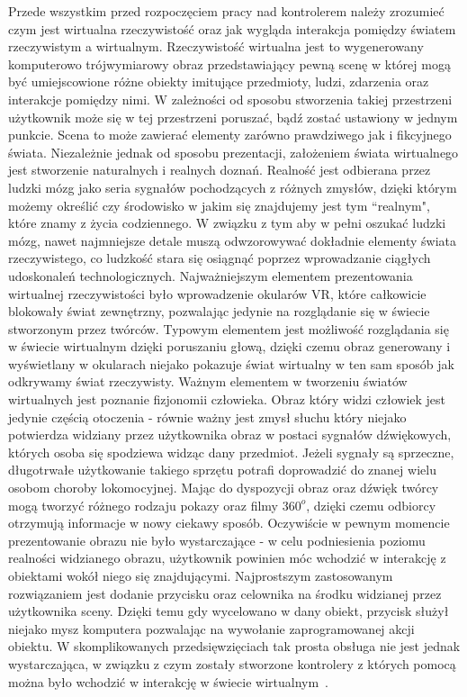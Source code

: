 	Przede wszystkim przed rozpoczęciem pracy nad kontrolerem należy zrozumieć czym jest wirtualna rzeczywistość oraz jak wygląda interakcja pomiędzy światem rzeczywistym a wirtualnym. Rzeczywistość wirtualna jest to wygenerowany komputerowo trójwymiarowy obraz przedstawiający pewną scenę w której mogą być umiejscowione różne obiekty imitujące przedmioty, ludzi, zdarzenia oraz interakcje pomiędzy nimi. W zależności od sposobu stworzenia takiej przestrzeni użytkownik może się w tej przestrzeni poruszać, bądź zostać ustawiony w jednym punkcie. Scena to może zawierać elementy zarówno prawdziwego jak i fikcyjnego świata. Niezależnie jednak od sposobu prezentacji, założeniem świata wirtualnego jest stworzenie naturalnych i realnych doznań. Realność jest odbierana przez ludzki mózg jako seria sygnałów pochodzących z różnych zmysłów, dzięki którym możemy określić czy środowisko w jakim się znajdujemy jest tym ``realnym", które znamy z życia codziennego. W związku z tym aby w pełni oszukać ludzki mózg, nawet najmniejsze detale muszą odwzorowywać dokładnie elementy świata rzeczywistego, co ludzkość stara się osiągnąć poprzez wprowadzanie ciągłych udoskonaleń technologicznych. Najważniejszym elementem prezentowania wirtualnej rzeczywistości było wprowadzenie okularów VR, które całkowicie blokowały świat zewnętrzny, pozwalając jedynie na rozglądanie się w świecie stworzonym przez twórców. Typowym elementem jest możliwość rozglądania się w świecie wirtualnym dzięki poruszaniu głową, dzięki czemu obraz generowany i wyświetlany w okularach niejako pokazuje świat wirtualny w ten sam sposób jak odkrywamy świat rzeczywisty. Ważnym elementem w tworzeniu światów wirtualnych jest poznanie fizjonomii człowieka. Obraz który widzi człowiek jest jedynie częścią otoczenia - równie ważny jest zmysł słuchu który niejako potwierdza widziany przez użytkownika obraz w postaci sygnałów dźwiękowych, których osoba się spodziewa widząc dany przedmiot. Jeżeli sygnały są sprzeczne, długotrwałe użytkowanie takiego sprzętu potrafi doprowadzić do znanej wielu osobom choroby lokomocyjnej. Mając do dyspozycji obraz oraz dźwięk twórcy mogą tworzyć różnego rodzaju pokazy oraz filmy $360^o$, dzięki czemu odbiorcy otrzymują informacje w nowy ciekawy sposób. Oczywiście w pewnym momencie prezentowanie obrazu nie było wystarczające - w celu podniesienia poziomu realności widzianego obrazu, użytkownik powinien móc wchodzić w interakcję z obiektami wokół niego się znajdującymi. Najprostszym zastosowanym rozwiązaniem jest dodanie przycisku oraz celownika na środku widzianej przez użytkownika sceny. Dzięki temu gdy wycelowano w dany obiekt, przycisk służył niejako mysz komputera pozwalając na wywołanie zaprogramowanej akcji obiektu. W skomplikowanych przedsięwzięciach tak prosta obsługa nie jest jednak wystarczająca, w związku z czym zostały stworzone kontrolery z których pomocą można było wchodzić w interakcję w świecie wirtualnym~\cite{vrHistory}. 

